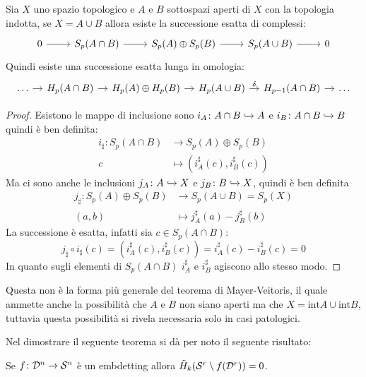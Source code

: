 \begin{theorem}
  Sia $ X $ uno spazio topologico e $ A $ e $ B $ sottospazi aperti di $ X $ con la
  topologia indotta, se $ X = A \cup B $ allora esiste la successione esatta di complessi:
  \[
    \begin{tikzcd}
      0 \rar & S_p(A \cap B) \rar & S_p(A) \oplus S_p(B) \rar & S_p(A \cup B) \rar & 0
    \end{tikzcd}
  \]
  Quindi esiste una successione esatta lunga in omologia:
  \[
    \begin{tikzcd}[nodes = {column sep = 10 pt}]
      \dots \rar & H_p(A \cap B) \rar & H_p(A) \oplus H_p(B) \rar & H_p(A \cup B) \rar{\delta} & H_{p-1}(A \cap B) \rar & \dots
    \end{tikzcd}
  \]
\end{theorem}
\begin{proof}
  Esistono le mappe di inclusione sono $ i_A \colon A \cap B \xhookrightarrow{} A $ e $ i_B \colon A \cap B \xhookrightarrow{} B $ quindi
  è ben definita:
  \begin{align*}
    i_\sharp \colon S_p(A \cap B) & \to S_p(A) \oplus S_p(B) \\
    c & \mapsto (i_A^\sharp (c), i_B^\sharp (c))
  \end{align*}
  Ma ci sono anche le inclusioni $ j_A \colon A \xhookrightarrow{} X $ e $ j_B \colon B \xhookrightarrow{} X $,
  quindi è ben definita
  \begin{align*}
    j_\sharp \colon  S_p(A) \oplus S_p(B) & \to S_p(A \cup B) = S_p(X) \\
    (a,b) &  \mapsto j_A^\sharp(a) - j_B^\sharp(b)
  \end{align*}
  La successione è esatta, infatti sia $ c \in S_p(A \cap B) $:
  \[
    j_\sharp \circ i_\sharp (c) = (i_A^\sharp (c), i_B^\sharp (c)) = i_A^\sharp (c) -  i_B^\sharp (c) = 0
  \]
  In quanto sugli elementi di $ S_p(A \cap B) $ $ i_A^\sharp $ e $ i_B^\sharp $ agiscono
  allo stesso modo.
\end{proof}

\begin{osservation}
  Questa non è la forma più generale del teorema di Mayer-Veitoris, il quale
  ammette anche la possibilità che $ A $ e $ B $ non siano aperti ma che
  $ X = \mathrm{int} A \cup \mathrm{int} B $, tuttavia questa possibilità si rivela
  necessaria solo in casi patologici.
\end{osservation}

Nel dimostrare il seguente teorema si dà per noto il seguente risultato:
\begin{lemma}
  Se $ f \colon \mathcal{D}^{n} \to \mathcal{S}^{n} $ è un embdetting allora $ \tilde{H}_k(\mathcal{S}^{r} \setminus f(\mathcal{D}^{r})) = 0 $.
\end{lemma}

